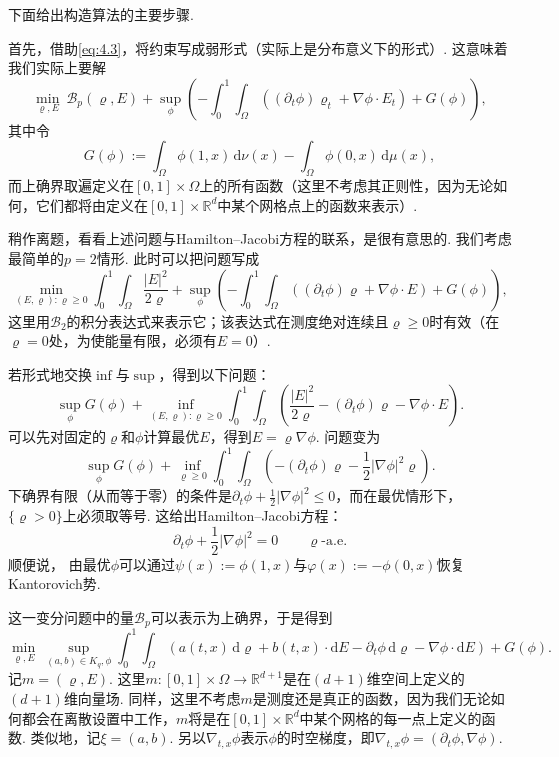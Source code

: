下面给出构造算法的主要步骤.

首先，借助\eqref{eq:4.3}，将约束写成弱形式（实际上是分布意义下的形式）. 这意味着我们实际上要解
\[
\min_{\varrho,E}\ \mathscr B_p(\varrho,E)+
\sup_\phi\left(-\int_0^1\int_\Omega
((\partial_t\phi)\varrho_t+\nabla\phi\cdot E_t)+G(\phi)\right),
\]
其中令
\[
G(\phi):=\int_\Omega\phi(1,x)\,\mathrm d\nu(x)
-\int_\Omega\phi(0,x)\,\mathrm d\mu(x),
\]
而上确界取遍定义在$[0,1]\times\Omega$上的所有函数（这里不考虑其正则性，因为无论如何，它们都将由定义在$[0,1]\times\mathbb R^d$中某个网格点上的函数来表示）.

\begin{remark}\label{obj:6.2}
稍作离题，看看上述问题与Hamilton--Jacobi方程的联系，是很有意思的. 我们考虑最简单的$p=2$情形. 此时可以把问题写成
\[
\min_{(E,\varrho):\varrho\ge0}\int_0^1\int_\Omega\frac{|E|^2}{2\varrho}
+\sup_\phi\left(-\int_0^1\int_\Omega
((\partial_t\phi)\varrho+\nabla\phi\cdot E)+G(\phi)\right),
\]
这里用$\mathscr B_2$的积分表达式来表示它；该表达式在测度绝对连续且$\varrho\ge0$时有效（在$\varrho=0$处，为使能量有限，必须有$E=0$）.

若形式地交换$\inf$与$\sup$，得到以下问题：
\[
\sup_\phi G(\phi)+\inf_{(E,\varrho):\varrho\ge0}
\int_0^1\int_\Omega\left(\frac{|E|^2}{2\varrho}
-(\partial_t\phi)\varrho-\nabla\phi\cdot E\right).
\]
可以先对固定的$\varrho$和$\phi$计算最优$E$，得到$E=\varrho\nabla\phi$. 问题变为
\[
\sup_\phi G(\phi)+\inf_{\varrho\ge0}\int_0^1\int_\Omega
\left(-(\partial_t\phi)\varrho-\frac12|\nabla\phi|^2\varrho\right).
\]
下确界有限（从而等于零）的条件是$\partial_t\phi+\frac12|\nabla\phi|^2\le0$，而在最优情形下，$\{\varrho>0\}$上必须取等号. 这给出Hamilton--Jacobi方程：
\[
\partial_t\phi+\frac12|\nabla\phi|^2=0\qquad\varrho\text{-a.e.}
\]
顺便说，\label{idx:i83-p223}
由最优$\phi$可以通过$\psi(x):=\phi(1,x)$与$\varphi(x):=-\phi(0,x)$恢复Kantorovich势.
\end{remark}

这一变分问题中的量$\mathscr B_p$可以表示为上确界，于是得到
\[
\min_{\varrho,E}\ \sup_{(a,b)\in K_q,\phi}
\int_0^1\int_\Omega
(a(t,x)\,\mathrm d\varrho+b(t,x)\cdot\mathrm dE
-\partial_t\phi\,\mathrm d\varrho-\nabla\phi\cdot\mathrm dE)+G(\phi).
\]
记$m=(\varrho,E)$. 这里$m:[0,1]\times\Omega\to\mathbb R^{d+1}$是在$(d+1)$维空间上定义的$(d+1)$维向量场. 同样，这里不考虑$m$是测度还是真正的函数，因为我们无论如何都会在离散设置中工作，$m$将是在$[0,1]\times\mathbb R^d$中某个网格的每一点上定义的函数. 类似地，记$\xi=(a,b)$. 另以$\nabla_{t,x}\phi$表示$\phi$的时空梯度，即$\nabla_{t,x}\phi=(\partial_t\phi,\nabla\phi)$.

